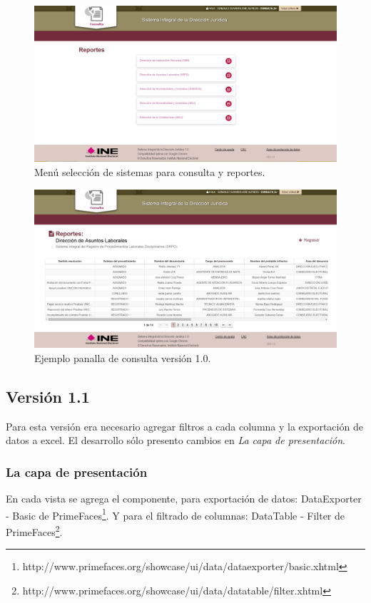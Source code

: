 \documentclass[../reportesINE.tex]{subfiles}
\begin{document}
\begin{figure}[h]
  \centering
  \includegraphics[width=\linewidth]{img/menuUno.png}
  \caption{Menú selección de sistemas para consulta y reportes. }
  \label{fig:menuUno}
\end{figure}

\begin{figure}
  \centering
  \includegraphics[width=\linewidth]{img/versionUno.png}
  \caption{Ejemplo panalla de consulta versión 1.0. }
  \label{fig:versionUno}
\end{figure}

\subsection{Versión 1.1}
Para esta versión era necesario agregar filtros a cada columna y la exportación de datos a excel. El desarrollo sólo presento cambios en \textit{La capa de presentación}. 

\subsubsection{La capa de presentación}
En cada vista se agrega el componente, para exportación de datos:  
DataExporter - Basic de PrimeFaces\footnote{http://www.primefaces.org/showcase/ui/data/dataexporter/basic.xhtml}. 
Y para el filtrado de columnas: 
DataTable - Filter de PrimeFaces\footnote{http://www.primefaces.org/showcase/ui/data/datatable/filter.xhtml}.
\end{document}
